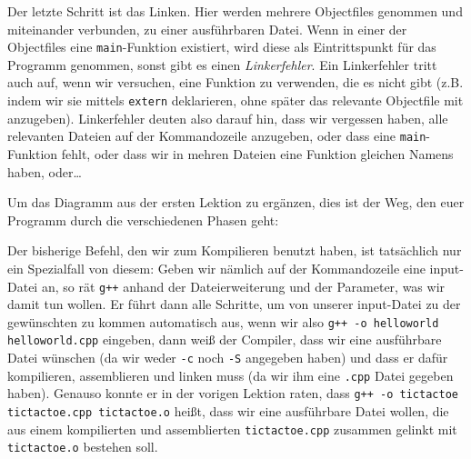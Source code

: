 Der letzte Schritt ist das Linken. Hier werden mehrere Objectfiles genommen und
miteinander verbunden, zu einer ausführbaren Datei. Wenn in einer der
Objectfiles eine \texttt{main}-Funktion existiert, wird diese als
Eintrittspunkt für das Programm genommen, sonst gibt es einen
\emph{Linkerfehler}. Ein Linkerfehler tritt auch auf, wenn wir versuchen, eine
Funktion zu verwenden, die es nicht gibt (z.B. indem wir sie mittels
\texttt{extern} deklarieren, ohne später das relevante Objectfile mit
anzugeben). Linkerfehler deuten also darauf hin, dass wir vergessen haben, alle
relevanten Dateien auf der Kommandozeile anzugeben, oder dass eine
\texttt{main}-Funktion fehlt, oder dass wir in mehren Dateien eine Funktion
gleichen Namens haben, oder\dots

Um das Diagramm aus der ersten Lektion zu ergänzen, dies ist der Weg, den euer
Programm durch die verschiedenen Phasen geht:


Der bisherige Befehl, den wir zum Kompilieren benutzt haben, ist tatsächlich
nur ein Spezialfall von diesem: Geben wir nämlich auf der Kommandozeile eine
input-Datei an, so rät \texttt{g++} anhand der Dateierweiterung und der
Parameter, was wir damit tun wollen. Er führt dann alle Schritte, um von
unserer input-Datei zu der gewünschten zu kommen automatisch aus, wenn wir also
\texttt{g++ -o helloworld helloworld.cpp} eingeben, dann weiß der Compiler,
dass wir eine ausführbare Datei wünschen (da wir weder \texttt{-c} noch
\texttt{-S} angegeben haben) und dass er dafür kompilieren, assemblieren und
linken muss (da wir ihm eine \texttt{.cpp} Datei gegeben haben). Genauso konnte
er in der vorigen Lektion raten, dass \texttt{g++ -o tictactoe tictactoe.cpp
    tictactoe.o} heißt, dass wir eine ausführbare Datei wollen, die aus einem
kompilierten und assemblierten \texttt{tictactoe.cpp} zusammen gelinkt mit
\texttt{tictactoe.o} bestehen soll.

